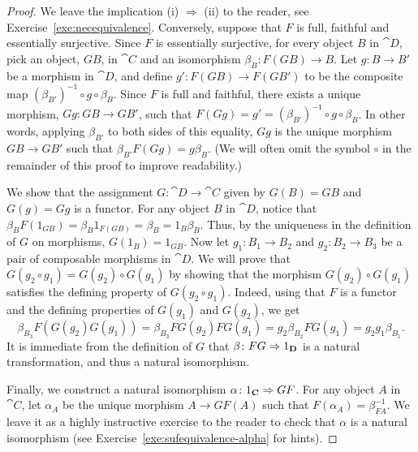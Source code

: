 \begin{proof}
  We leave the implication (i) $\Rightarrow$ (ii) to the reader, see Exercise~\ref{exe:necequivalence}. Conversely, suppose that $F$ is full, faithful and essentially surjective. Since $F$ is essentially surjective, for every object $B$ in $\cat{D}$, pick an object, $GB$, in $\cat{C}$ and an isomorphism $\beta_B \colon F(GB) \to B$. Let $g \colon B \to B'$ be a morphism in $\cat{D}$, and define $g' \colon F(GB) \to F(GB')$ to be the composite map $(\beta_{B'})^{-1} \circ g \circ \beta_B$. Since $F$ is full and faithful, there exists a unique morphism, $Gg \colon GB \to GB'$, such that $F(Gg) = g' = (\beta_{B'})^{-1} \circ g \circ \beta_B$. In other words, applying $\beta_{B'}$ to both sides of this equality, $Gg$ is the unique morphism $GB \to GB'$ such that $\beta_{B'} F(Gg) = g \beta_B$. (We will often omit the symbol $\circ$ in the remainder of this proof to improve readability.)

  We show that the assignment $G \colon \cat{D} \to \cat{C}$ given by $G(B)=GB$ and $G(g)=Gg$ is a functor. For any object $B$ in $\cat{D}$, notice that $\beta_B F(1_{GB}) = \beta_B 1_{F(GB)} =\beta_B= 1_B \beta_B$. Thus, by the uniqueness in the definition of $G$ on morphisms, $G(1_B) = 1_{GB}$. Now let $g_1 \colon B_1 \to B_2$ and $g_2 \colon B_2 \to B_3$ be a pair of composable morphisms in $\cat{D}$. We will prove that $G(g_2 \circ g_1) = G(g_2) \circ G(g_1)$ by showing that the morphism $G(g_2) \circ G(g_1)$ satisfies the defining property of $G(g_2 \circ g_1)$. Indeed, using that $F$ is a functor and the defining properties of $G(g_1)$ and $G(g_2)$, we get
  \[ \beta_{B_3} F(G(g_2) G(g_1)) = \beta_{B_3} FG(g_2) FG(g_1) = g_2 \beta_{B_2} FG(g_1) = g_2 g_1 \beta_{B_1}.\]
  It is immediate from the definition of $G$ that $\beta \colon FG \Rightarrow 1_{\mathbf{D}}$ is a natural transformation, and thus a natural isomorphism.

  Finally, we construct a natural isomorphism $\alpha \colon 1_{\mathbf{C}} \Rightarrow GF$. For any object $A$ in $\cat{C}$, let $\alpha_A$ be the unique morphism $A \to GF(A)$ such that $F(\alpha_A) = \beta_{FA}^{-1}$. We leave it as a highly instructive exercise to the reader to check that $\alpha$ is a natural isomorphism (see Exercise~\ref{exe:sufequivalence-alpha} for hints).
\end{proof}

